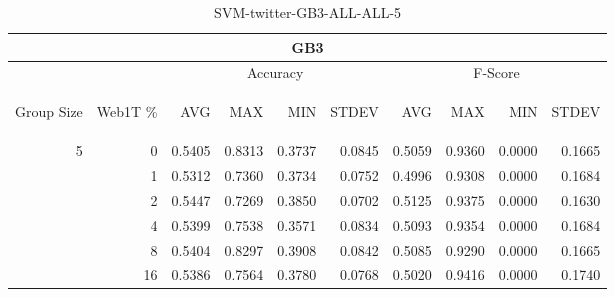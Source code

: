 \begin{center}
\begin{table}[htbp] 
 \begin{center}
\begin{tabular}{ | r | r | r | r | r | r | r | r | r | r |}
\hline
\multicolumn{10}{|c|}{GB3}\\
\hline
 & & \multicolumn{4}{|c|}{Accuracy} & \multicolumn{4}{|c|}{F-Score}\\ \cline{3-10}
\begin{sideways}Group Size\end{sideways} & \begin{sideways}Web1T \%\end{sideways} & \begin{sideways}AVG\end{sideways} & \begin{sideways}MAX\end{sideways} & \begin{sideways}MIN\end{sideways} & \begin{sideways}STDEV\end{sideways} & \begin{sideways}AVG\end{sideways} & \begin{sideways}MAX\end{sideways} & \begin{sideways}MIN\end{sideways} & \begin{sideways}STDEV\end{sideways}\\
\hline
\multirow{5}{*}{5}
 & 0 & 0.5405 & 0.8313 & 0.3737 & 0.0845 & 0.5059 & 0.9360 & 0.0000 & 0.1665\\ \cline{2-10}
 & 1 & 0.5312 & 0.7360 & 0.3734 & 0.0752 & 0.4996 & 0.9308 & 0.0000 & 0.1684\\ \cline{2-10}
 & 2 & 0.5447 & 0.7269 & 0.3850 & 0.0702 & 0.5125 & 0.9375 & 0.0000 & 0.1630\\ \cline{2-10}
 & 4 & 0.5399 & 0.7538 & 0.3571 & 0.0834 & 0.5093 & 0.9354 & 0.0000 & 0.1684\\ \cline{2-10}
 & 8 & 0.5404 & 0.8297 & 0.3908 & 0.0842 & 0.5085 & 0.9290 & 0.0000 & 0.1665\\ \cline{2-10}
 & 16 & 0.5386 & 0.7564 & 0.3780 & 0.0768 & 0.5020 & 0.9416 & 0.0000 & 0.1740\\ \cline{2-10}
\hline
\end{tabular}
\caption{SVM-twitter-GB3-ALL-ALL-5}
\label{table:SVM-twitter-GB3-ALL-ALL-5}
\end{center}
 \end{table}
\end{center}

